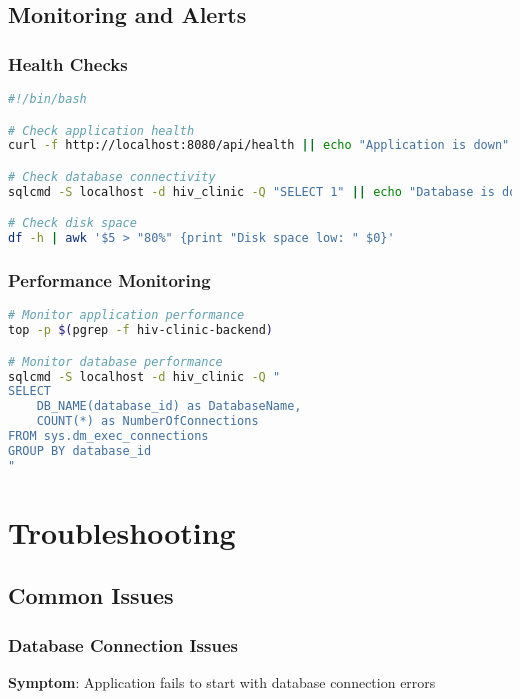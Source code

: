 \documentclass[12pt,a4paper]{article}
\begin{document}
\subsection{Monitoring and Alerts}

\subsubsection{Health Checks}

\begin{lstlisting}[language=bash, caption=Health Check Script]
#!/bin/bash

# Check application health
curl -f http://localhost:8080/api/health || echo "Application is down"

# Check database connectivity
sqlcmd -S localhost -d hiv_clinic -Q "SELECT 1" || echo "Database is down"

# Check disk space
df -h | awk '$5 > "80%" {print "Disk space low: " $0}'
\end{lstlisting}

\subsubsection{Performance Monitoring}

\begin{lstlisting}[language=bash, caption=Performance Monitoring]
# Monitor application performance
top -p $(pgrep -f hiv-clinic-backend)

# Monitor database performance
sqlcmd -S localhost -d hiv_clinic -Q "
SELECT 
    DB_NAME(database_id) as DatabaseName,
    COUNT(*) as NumberOfConnections
FROM sys.dm_exec_connections
GROUP BY database_id
"
\end{lstlisting}

\section{Troubleshooting}

\subsection{Common Issues}

\subsubsection{Database Connection Issues}

\textbf{Symptom}: Application fails to start with database connection errors
\end{document}
